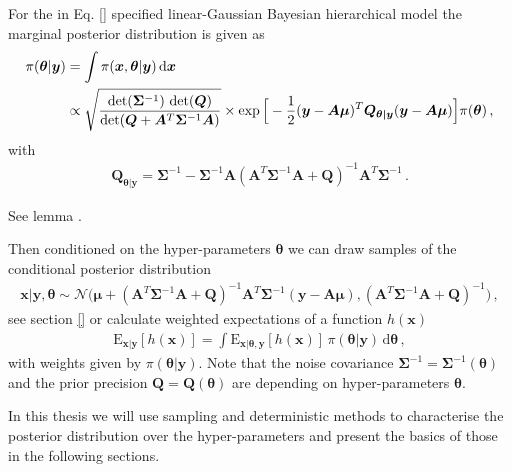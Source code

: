 For the in Eq. \ref{} specified linear-Gaussian Bayesian hierarchical model the marginal posterior distribution is given as
\begin{align}
	\pi(\bm{\theta} | \bm{y}) &= \int \pi(\bm{x}, \bm{\theta} | \bm{y}) \mathop{}\!\mathrm{d} \bm{x} \\ 
	\label{eq:condHyper}
	&\propto \sqrt{ \frac{ \det( \bm{\Sigma}^{-1} ) \,  \det( \bm{Q}) }{\det( \bm{Q} + \bm{A}^T \bm{\Sigma}^{-1} \bm{A} ) } } \times \exp \Big[ - \frac{1}{2}(\bm{y} -\bm{A \mu})^T \bm{Q}_{\bm{\theta|y}} (\bm{y} -\bm{A \mu}) \Big] \pi(\bm{\theta}) \, ,
\end{align}
with
\begin{align}
	\bm{Q}_{\bm{\theta|y}} = \bm{\Sigma}^{-1} - \bm{\Sigma}^{-1} \bm{A} (\bm{A}^T \bm{\Sigma}^{-1} \bm{A} + \bm{Q} )^{-1} \bm{A}^T \bm{\Sigma}^{-1} \,  .
\end{align}

See lemma \cite{}.

Then conditioned on the hyper-parameters $\bm{\theta}$ we can draw samples of the conditional posterior distribution
\begin{align}
	\bm{x}| \bm{y} , \bm{\theta} \sim \mathcal{N}\big( \bm{\mu} + (\bm{A}^T \bm{\Sigma}^{-1} \bm{A} + \bm{Q} )^{-1} \bm{A}^T \bm{\Sigma}^{-1} (\bm{y} - \bm{A} \bm{\mu}), (\bm{A}^T \bm{\Sigma}^{-1} \bm{A} + \bm{Q} )^{-1} \big) \, ,
\end{align}
see section \ref{} or calculate weighted expectations of a function $h(\bm{x})$
\begin{align}
	\label{eq:lte}
	\text{E}_{\bm{x}|\bm{y}} [h(\bm{x})] = \int   \text{E}_{\bm{x}|\bm{\theta},\bm{y}} [h(\bm{x})] \, \pi(\bm{\theta} | \bm{y} )  \, \text{d} \bm{\theta} \,  ,
\end{align}
with weights given by $\pi(\bm{\theta} | \bm{y} )$.
\cite{}
Note that the noise covariance $\bm{\Sigma}^{-1} = \bm{\Sigma}^{-1}( \bm{\theta}) $ and the prior precision $\bm{Q} = \bm{Q}( \bm{\theta})$ are depending on hyper-parameters $\bm{\theta}$.

In this thesis we will use sampling and deterministic methods to characterise the posterior distribution over the hyper-parameters and present the basics of those in the following sections.


